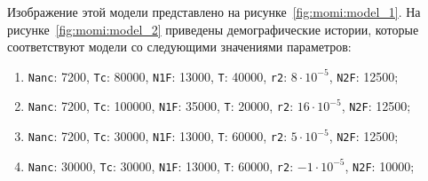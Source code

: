 Изображение этой модели представлено на рисунке~\ref{fig:momi:model_1}.
На рисунке~\ref{fig:momi:model_2} приведены демографические истории, которые соответствуют модели со следующими значениями параметров:
\begin{enumerate}[label={\arabic*}.]
    \item \texttt{Nanc}: 7200, \texttt{Tc}: 80000, \texttt{N1F}: 13000, \texttt{T}: 40000, \texttt{r2}: $8\cdot 10^{-5}$, \texttt{N2F}: 12500;
    \item \texttt{Nanc}: 7200, \texttt{Tc}: 100000, \texttt{N1F}: 35000, \texttt{T}: 20000, \texttt{r2}: $16\cdot 10^{-5}$, \texttt{N2F}: 12500;
    \item \texttt{Nanc}: 7200, \texttt{Tc}: 30000, \texttt{N1F}: 13000, \texttt{T}: 60000, \texttt{r2}: $5\cdot 10^{-5}$, \texttt{N2F}: 12500;
    \item \texttt{Nanc}: 30000, \texttt{Tc}: 30000, \texttt{N1F}: 13000, \texttt{T}: 60000, \texttt{r2}: $-1\cdot 10^{-5}$, \texttt{N2F}: 10000;
\end{enumerate}

